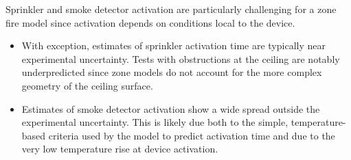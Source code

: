 Sprinkler and smoke detector activation are particularly challenging for a zone fire model since activation depends on conditions local to the device.  
\begin{itemize}
\item With exception, estimates of sprinkler activation time are typically near experimental uncertainty. Tests with obstructions at the ceiling are notably underpredicted since zone models do not account for the more complex geometry of the ceiling surface. 
\item Estimates of smoke detector activation show a wide spread outside the experimental uncertainty.  This is likely due both to the simple, temperature-based criteria used by the model to predict activation time and due to the very low temperature rise at device activation.
\end{itemize}




